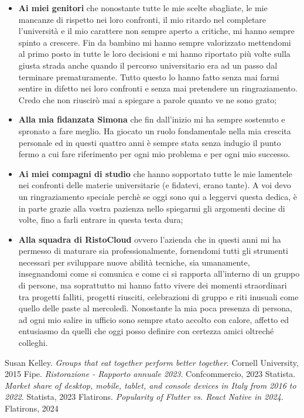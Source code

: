 \documentclass[a4paper, titlepage, 12pt, openright, twoside]{book}
\begin{document}
\begin{itemize}
	\item \textbf{Ai miei genitori} che nonostante tutte le mie scelte sbagliate, le mie mancanze di rispetto nei loro confronti, il mio ritardo nel completare l'università e il mio carattere non sempre aperto a critiche, mi hanno sempre spinto a crescere. Fin da bambino mi hanno sempre valorizzato mettendomi al primo posto in tutte le loro decisioni e mi hanno riportato più volte sulla giusta strada anche quando il percorso universitario era ad un passo dal terminare prematuramente. Tutto questo lo hanno fatto senza mai farmi sentire in difetto nei loro confronti e senza mai pretendere un ringraziamento. Credo che non riuscirò mai a spiegare a parole quanto ve ne sono grato;
	\item \textbf{Alla mia fidanzata Simona} che fin dall'inizio mi ha sempre sostenuto e spronato a fare meglio. Ha giocato un ruolo fondamentale nella mia crescita personale ed in questi quattro anni è sempre stata senza indugio il punto fermo a cui fare riferimento per ogni mio problema e per ogni mio successo.
	\item \textbf{Ai miei compagni di studio} che hanno sopportato tutte le mie lamentele nei confronti delle materie universitarie (e fidatevi, erano tante). A voi devo un ringraziamento speciale perchè se oggi sono qui a leggervi questa dedica, è in parte grazie alla vostra pazienza nello spiegarmi gli argomenti decine di volte, fino a farli entrare in questa testa dura;
	\item \textbf{Alla squadra di RistoCloud} ovvero l'azienda che in questi anni mi ha permesso di maturare sia professionalmente, fornendomi tutti gli strumenti necessari per sviluppare nuove abilità tecniche, sia umanamente, insegnandomi come si comunica e come ci si rapporta all'interno di un gruppo di persone, ma soprattutto mi hanno fatto vivere dei momenti straordinari tra progetti falliti, progetti riusciti, celebrazioni di gruppo e riti inusuali come quello delle paste al mercoledì. Nonostante la mia poca presenza di persona, ad ogni mio salire in ufficio sono sempre stato accolto con calore, affetto ed entusiasmo da quelli che oggi posso definire con certezza amici oltreché colleghi.
\end{itemize}

\begin{thebibliography}{4}
	 Susan Kelley. \textsl{Groups that eat together perform better together}. Cornell University, 2015
	 Fipe. \textsl{Ristorazione - Rapporto annuale 2023}. Confcommercio, 2023
	 Statista. \textsl{Market share of desktop, mobile, tablet, and console devices in Italy from 2016 to 2022}. Statista, 2023
	 Flatirons. \textsl{Popularity of Flutter vs. React Native in 2024}. Flatirons, 2024
\end{thebibliography}
\end{document}
